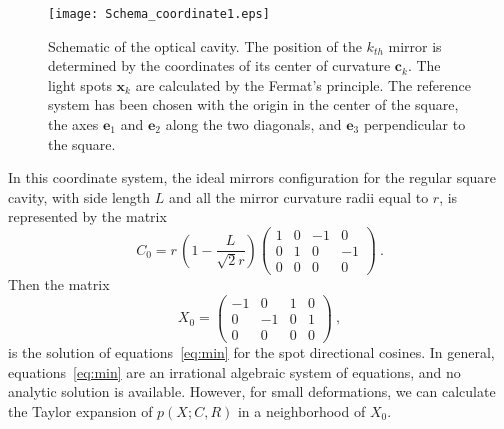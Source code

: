 \documentclass[12pt,a4paper,final]{iopart}
\begin{document}
\begin{figure}[h]
\centerline{\texttt{[image: Schema\_coordinate1.eps]}}
\caption{\label{fig:disegnocav} Schematic of the optical cavity. The position
of the $k_{th}$ mirror is determined by the coordinates of its center
of curvature $\mathbf{c}_{k}$. The light spots $\mathbf{x}_{k}$
are calculated by the Fermat's principle. The reference system has
been chosen with the origin in the center of the square, the axes
$\mathbf{e}_{1}$ and $\mathbf{e}_{2}$ along the two diagonals, and
$\mathbf{e}_{3}$ perpendicular to the square.}
\end{figure}

In this coordinate system, the ideal mirrors configuration for the regular square cavity, 
with side length $L$ and all the mirror curvature radii equal to
$r$, is represented by the matrix
\begin{equation}
C_{0}= r\, \left (1-\frac{L}{\sqrt{2}r} \right )\left(\begin{array}{cccc}
1 & 0 & -1 & 0 \nonumber \\
0 & 1 & 0 & -1 \nonumber \\
0 & 0 & 0 & 0 \nonumber 
\end{array}\right)\ .
\end{equation}
Then the matrix
\begin{equation}
X_{0}=\left(\begin{array}{cccc}
-1 & 0 & 1 & 0 \nonumber \\
0 & -1 & 0 & 1 \nonumber \\
0 & 0 & 0 & 0 \nonumber
\end{array}\right)\ ,
\end{equation} is the solution of equations~\ref{eq:min} for the spot directional cosines. In general, equations~\ref{eq:min} are 
an irrational algebraic system
of equations, and no analytic solution is available. However, for small deformations, 
we can calculate the Taylor expansion of $p(X;C,R)$ in a neighborhood of $X_{0}$. \\
\end{document}
